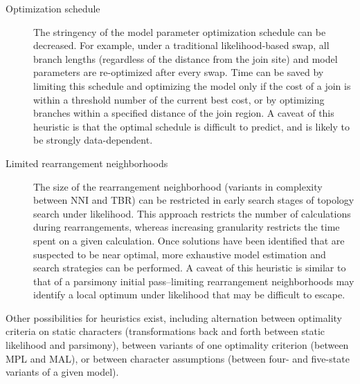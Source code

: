 \begin{description}
\item[Optimization schedule] The stringency of the model parameter optimization schedule can be decreased. For example, under a traditional 
likelihood-based swap, all branch lengths (regardless of the distance from the join site) and model parameters are 
re-optimized after every swap. Time can be saved by limiting this schedule and optimizing the model only if the cost of a join is within a threshold number 
of the current best cost, or by optimizing branches within a specified distance of the join region. A caveat of this heuristic is that the optimal
schedule is difficult to predict, and is likely to be strongly data-dependent.

\item[Limited rearrangement neighborhoods] The size of the rearrangement neighborhood (variants in complexity between NNI and TBR) 
can be restricted in early search stages of topology search under likelihood. This approach restricts the number of calculations during rearrangements, 
whereas increasing granularity restricts the time spent on a given calculation. Once solutions have been identified that are suspected to be near optimal, 
more exhaustive model estimation and search strategies can be performed. A caveat of this heuristic is similar to that of a parsimony initial pass--limiting 
rearrangement neighborhoods may identify a local optimum under likelihood that may be difficult to escape.

\end{description}
Other possibilities for heuristics exist, including alternation between optimality criteria on static characters (transformations back and 
forth between static likelihood and parsimony), between variants of one optimality criterion (between MPL and MAL), or between 
character assumptions (between four- and five-state variants of a given model). 




